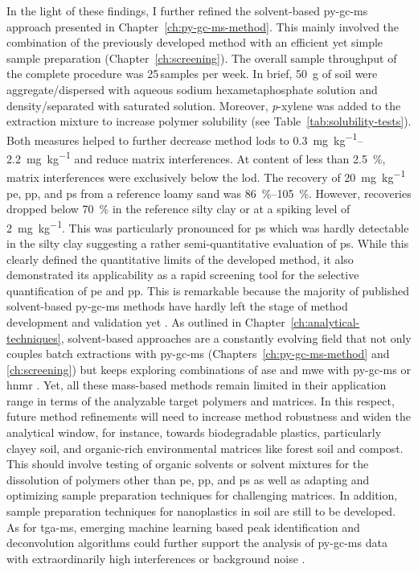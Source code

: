 In the light of these findings, I further refined the solvent-based \ac{py-gc-ms} approach presented in Chapter~\ref{ch:py-gc-ms-method}. This mainly involved the combination of the previously developed method with an efficient yet simple sample preparation (Chapter~\ref{ch:screening}). The overall sample throughput of the complete procedure was \num{25}\,samples per week.
In brief, \SI{50}{\gram} of soil were aggregate\-/dispersed with aqueous sodium hexametaphosphate solution and density\-/separated with saturated  solution. Moreover, \textit{p}-xylene was added to the extraction mixture to increase polymer solubility (see Table~\ref{tab:solubility-tests}). Both measures helped to further decrease method \acp{lod} to \SIrange{0.3}{2.2}{\milli\gram\per\kilo\gram} and reduce matrix interferences. At  content of less than \SI{2.5}{\percent}, matrix interferences were exclusively below the \ac{lod}. The recovery of \SI{20}{\milli\gram\per\kilo\gram} \ac{pe}, \ac{pp}, and \ac{ps} from a reference loamy sand was \SIrange{86}{105}{\percent}. However, recoveries dropped below \SI{70}{\percent} in the reference silty clay or at a spiking level of \SI{2}{\milli\gram\per\kilo\gram}. This was particularly pronounced for \ac{ps} which was hardly detectable in the silty clay suggesting a rather semi-quantitative evaluation of \ac{ps}.
While this clearly defined the quantitative limits of the developed method, it also demonstrated its applicability as a rapid screening tool for the selective quantification of \ac{pe} and \ac{pp}. This is remarkable because the majority of published solvent-based \ac{py-gc-ms} methods have hardly left the stage of method development and validation yet \citep{DierkesQuantification2019,OkoffoIdentification2020}. As outlined in Chapter~\ref{ch:analytical-techniques}, solvent-based approaches are a constantly evolving field that not only couples batch extractions with \ac{py-gc-ms} (Chapters~\ref{ch:py-gc-ms-method} and \ref{ch:screening}) but keeps exploring combinations of \ac{ase} and \ac{mwe} with \ac{py-gc-ms} or \ac{hnmr} \citep{OkoffoIdentification2020,HermabessiereMicrowaveAssisted2021,NelsonQuantification2019,PeezQuantitative2020}.
Yet, all these mass-based methods remain limited in their application range in terms of the analyzable target polymers and matrices. In this respect, future method refinements will need to increase method robustness and widen the analytical window, for instance, towards biodegradable plastics, particularly clayey soil, and organic-rich environmental matrices like forest soil and compost. This should involve testing of organic solvents or solvent mixtures for the dissolution of polymers other than \ac{pe}, \ac{pp}, and \ac{ps} as well as adapting and optimizing sample preparation techniques for challenging matrices. In addition, sample preparation techniques for nanoplastics in soil are still to be developed. As for \ac{tga-ms}, emerging machine learning based peak identification and deconvolution algorithms could further support the analysis of \ac{py-gc-ms} data with extraordinarily high interferences or background noise \citep{CowgerCritical2020,MatsuiIdentification2020}.
